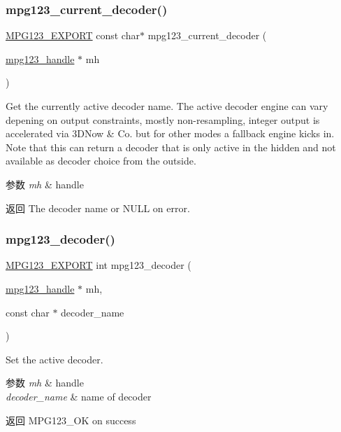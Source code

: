 \subsubsection{\texorpdfstring{mpg123\+\_\+current\+\_\+decoder()}{mpg123\_current\_decoder()}}
{\footnotesize\ttfamily \hyperlink{mpg123_8h_a2ba98cfba3f760879df70e755b2a61cc}{M\+P\+G123\+\_\+\+E\+X\+P\+O\+RT} const char$\ast$ mpg123\+\_\+current\+\_\+decoder (\begin{DoxyParamCaption}\item[{\hyperlink{group__mpg123__init_ga6728e2839a395f3a07d4514da659faca}{mpg123\+\_\+handle} $\ast$}]{mh }\end{DoxyParamCaption})}

Get the currently active decoder name. The active decoder engine can vary depening on output constraints, mostly non-\/resampling, integer output is accelerated via 3\+D\+Now \& Co. but for other modes a fallback engine kicks in. Note that this can return a decoder that is only active in the hidden and not available as decoder choice from the outside. 
\begin{DoxyParams}{参数}
{\em mh} & handle \\
\hline
\end{DoxyParams}
\begin{DoxyReturn}{返回}
The decoder name or N\+U\+LL on error. 
\end{DoxyReturn}
\mbox{\label{group__mpg123__decoder_gae21df3e432dc90e9983d9fea25372cdc}} 
\subsubsection{\texorpdfstring{mpg123\+\_\+decoder()}{mpg123\_decoder()}}
{\footnotesize\ttfamily \hyperlink{mpg123_8h_a2ba98cfba3f760879df70e755b2a61cc}{M\+P\+G123\+\_\+\+E\+X\+P\+O\+RT} int mpg123\+\_\+decoder (\begin{DoxyParamCaption}\item[{\hyperlink{group__mpg123__init_ga6728e2839a395f3a07d4514da659faca}{mpg123\+\_\+handle} $\ast$}]{mh,  }\item[{const char $\ast$}]{decoder\+\_\+name }\end{DoxyParamCaption})}

Set the active decoder. 
\begin{DoxyParams}{参数}
{\em mh} & handle \\
\hline
{\em decoder\+\_\+name} & name of decoder \\
\hline
\end{DoxyParams}
\begin{DoxyReturn}{返回}
M\+P\+G123\+\_\+\+OK on success 
\end{DoxyReturn}
\mbox{\label{group__mpg123__decoder_gaaa1b0af58f5f9654c736ccb24dcf0475}} 
